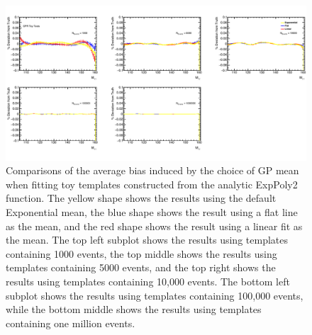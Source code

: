 \begin{figure} 
\begin{center}
  \includegraphics[width=\textwidth]{figures/background/gpr/checkBiasFromPriorChoice/Plots_GPR_PriorBiases_ExpPoly2_crop}   
   \caption{Comparisons of the average bias induced by the choice of GP mean when fitting toy templates constructed from the analytic ExpPoly2 function. The yellow shape shows the results using the default Exponential mean, the blue shape shows the result using a flat line as the mean, and the red shape shows the result using a linear fit as the mean. The top left subplot shows the results using templates containing 1000 events, the top middle shows the results using templates containing 5000 events, and the top right shows the results using templates containing 10,000 events. The bottom left subplot shows the results using templates containing 100,000 events, while the bottom middle shows the results using templates containing one million events.}
\label{fig:prior_bias_exppoly2}
\end{center}
\end{figure}


